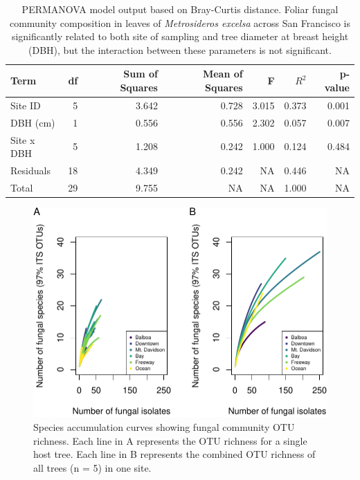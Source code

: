 \documentclass[fleqn,10pt,lineno]{wlpeerj} %
\begin{document}
\begin{table}[!h]

\caption{\label{tab:permanova-table}PERMANOVA model output based on Bray-Curtis distance. Foliar fungal community composition in leaves of \emph{Metrosideros excelsa} across San Francisco is significantly related to both site of sampling and tree diameter at breast height (DBH), but the interaction between these parameters is not significant.}
\centering
\begin{tabular}[t]{lrrrrrr}
\toprule
Term & df & Sum of Squares & Mean of Squares & F & $R^{2}$ & p-value\\
\midrule
Site ID & 5 & 3.642 & 0.728 & 3.015 & 0.373 & 0.001\\
DBH (cm) & 1 & 0.556 & 0.556 & 2.302 & 0.057 & 0.007\\
Site x DBH & 5 & 1.208 & 0.242 & 1.000 & 0.124 & 0.484\\
Residuals & 18 & 4.349 & 0.242 & NA & 0.446 & NA\\
Total & 29 & 9.755 & NA & NA & 1.000 & NA\\
\bottomrule
\end{tabular}
\end{table}

\begin{figure}
\centering
\includegraphics{gibson2023_files/figure-latex/rarefaction-plot-1.pdf}
\caption{\label{fig:rarefaction-plot}Species accumulation curves showing fungal community OTU richness. Each line in A represents the OTU richness for a single host tree. Each line in B represents the combined OTU richness of all trees (n = 5) in one site.}
\end{figure}
\end{document}

